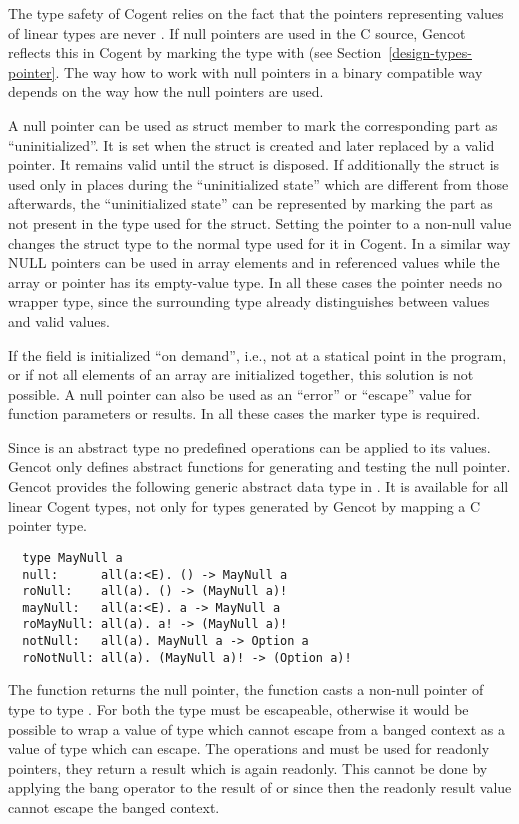The type safety of Cogent relies on the fact that the pointers representing values of linear types are never .
If null pointers are used in the C source, Gencot reflects this in Cogent by marking the type with  (see 
Section~\ref{design-types-pointer}. The way how to work with
null pointers in a binary compatible way depends on the way how the null pointers are used.

A null pointer can be used as struct member  to mark the corresponding part as ``uninitialized''. 
It is set when the struct is created and later
replaced by a valid pointer. It remains valid until the struct is disposed. If additionally the struct is used only in places
during the ``uninitialized state'' which are different from those afterwards, the ``uninitialized state'' can be represented
by marking the part  as not present in the type used for the struct. Setting the pointer to a non-null value 
changes the struct type to the normal type used for it in Cogent. In a similar way NULL pointers can be used in array
elements and in referenced values while the array or pointer has its empty-value type. In all these cases the pointer needs
no  wrapper type, since the surrounding type already distinguishes between  values and valid values.

If the field  is initialized ``on demand'', i.e., not at a statical point in the program, or if not all elements
of an array are initialized together, this solution is not possible.
A null pointer can also be used as an ``error'' or ``escape'' value for function parameters or results. In all these cases
the  marker type is required.

Since  is an abstract type no predefined operations can be applied to its values. Gencot only defines abstract 
functions for
generating and testing the null pointer. Gencot provides the following generic abstract data type in .
It is available for all linear Cogent types, not only for types generated by Gencot by mapping a C pointer type.
\begin{verbatim}
  type MayNull a 
  null:      all(a:<E). () -> MayNull a
  roNull:    all(a). () -> (MayNull a)!
  mayNull:   all(a:<E). a -> MayNull a
  roMayNull: all(a). a! -> (MayNull a)!
  notNull:   all(a). MayNull a -> Option a
  roNotNull: all(a). (MayNull a)! -> (Option a)!
\end{verbatim}
The function  returns the null pointer, the function  casts a non-null pointer of type 
to type . For both the type  must be escapeable, otherwise it would be possible to wrap a value
of type  which cannot escape from a banged context as a value of type  which can escape.
The operations  and  must be used for readonly pointers, they return a result which is again 
readonly. This cannot be done 
by applying the bang operator to the result of  or  since then the readonly result value
cannot escape the banged context. 

